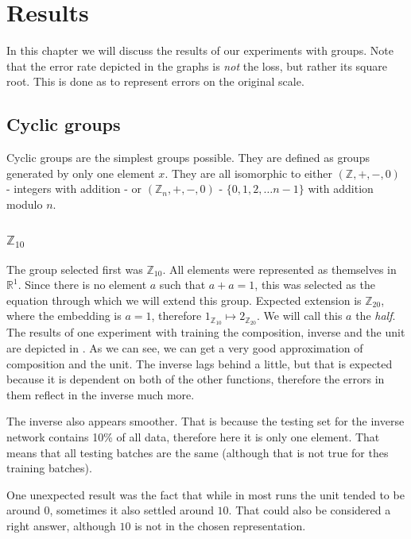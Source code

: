 \chapter{Results}
\label{chapter:results}
In this chapter we will discuss the results of our experiments with groups. Note that the error rate depicted in the graphs is \textit{not} the loss, but rather its square root. This is done as to represent errors on the original scale.

\section{Cyclic groups}
Cyclic groups are the simplest groups possible. They are defined as groups generated by only one element $x$. They are all isomorphic to either $(\mathbb{Z},+,-,0)$ - integers with addition - or $(\mathbb{Z}_n,+,-,0)$ - $\{0,1,2,\dots n-1\}$ with addition modulo $n$.

\subsection{$\mathbb{Z}_{10}$}

The group selected first was $\mathbb{Z}_{10}$. All elements were represented as themselves in $\mathbb{R}^1$. Since there is no element $a$ such that $a+a=1$, this was selected as the equation through which we will extend this group. Expected extension is $\mathbb{Z}_{20}$, where the embedding is $a = 1$, therefore $1_{\mathbb{Z}_{10}}\mapsto 2_{\mathbb{Z}_{20}}$. We will call this $a$ the \textit{half}.\\

The results of one experiment with training the composition, inverse and the unit are depicted in . As we can see, we can get a very good approximation of composition and the unit. The inverse lags behind a little, but that is expected because it is dependent on both of the other functions, therefore the errors in them reflect in the inverse much more. 

The inverse also appears smoother. That is because the testing set for the inverse network contains 10\% of all data, therefore here it is only one element. That means that all testing batches are the same (although that is not true for thes training batches).

One unexpected result was the fact that while in most runs the unit tended to be around $0$, sometimes it also settled around $10$. That could also be considered a right answer, although $10$ is not in the chosen representation.\\

